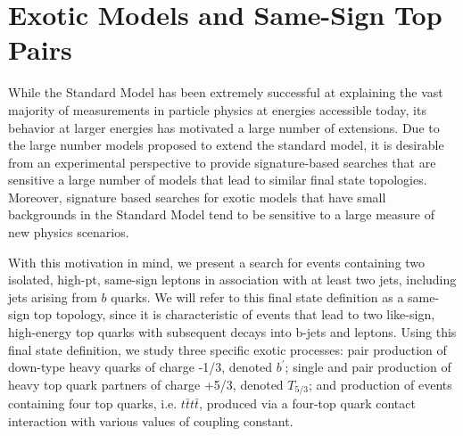 
\chapter{Exotic Models and Same-Sign Top Pairs}


While the Standard Model has been extremely successful at explaining the vast majority of measurements in particle physics at energies accessible today, its behavior at larger energies has motivated a large number of extensions.
Due to the large number models proposed to extend the standard model, it is desirable from an experimental perspective to provide signature-based searches that are sensitive a large number of models that lead to similar final state topologies.
Moreover, signature based searches for exotic models that have small backgrounds in the Standard Model tend to be sensitive to a large measure of new physics scenarios.

With this motivation in mind, we present a search for events containing two isolated, high-pt, same-sign leptons in association with at least two jets, including jets arising from $b$ quarks. 
We will refer to this final state definition as a same-sign top topology, since it is characteristic of events that lead to two like-sign, high-energy top quarks with subsequent decays into b-jets and leptons.
Using this final state definition, we study three specific exotic processes: pair production of down-type heavy quarks of charge -1/3, denoted $b^\prime$; single and pair production of heavy top quark partners of charge +5/3, denoted $T_{5/3}$; and production of events containing four top quarks, i.e. $t\bar{t}t\bar{t}$, produced via a four-top quark contact interaction with various values of coupling constant.

